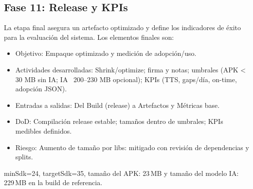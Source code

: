 \subsection{Fase 11: Release y KPIs}
La etapa final asegura un artefacto optimizado y define los indicadores de éxito para la evaluación del sistema. Los elementos finales son:

\begin{itemize}
  \item Objetivo: Empaque optimizado y medición de adopción/uso.
  \item Actividades desarrolladas: Shrink/optimize; firma y notas; umbrales (APK < 30 MB sin IA; IA ~200–230 MB opcional); KPIs (TTS, gaps/día, on-time, adopción JSON).
  \item Entradas a salidas: Del Build (release) a Artefactos y Métricas base.
  \item DoD: Compilación release estable; tamaños dentro de umbrales; KPIs medibles definidos.
  \item Riesgo: Aumento de tamaño por libs: mitigado con revisión de dependencias y splits.
\end{itemize}


\noindent minSdk=24, targetSdk=35, tamaño del APK: 23\,MB y tamaño del modelo IA: 229\,MB en la build de referencia.
